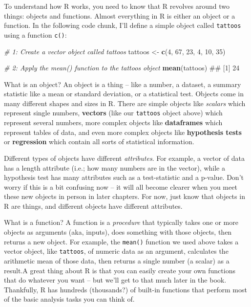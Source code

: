 \documentclass[]{book}
\newenvironment{Shaded}{\begin{snugshade}}{\end{snugshade}}
\newcommand{\KeywordTok}[1]{\textcolor[rgb]{0.13,0.29,0.53}{\textbf{{#1}}}}
\newcommand{\DecValTok}[1]{\textcolor[rgb]{0.00,0.00,0.81}{{#1}}}
\newcommand{\StringTok}[1]{\textcolor[rgb]{0.31,0.60,0.02}{{#1}}}
\newcommand{\CommentTok}[1]{\textcolor[rgb]{0.56,0.35,0.01}{\textit{{#1}}}}
\newcommand{\NormalTok}[1]{{#1}}
\theoremstyle{definition}
\theoremstyle{definition}
\theoremstyle{remark}
\begin{document}
To understand how R works, you need to know that R revolves around two
things: objects and functions. Almost everything in R is either an
object or a function. In the following code chunk, I'll define a simple
object called \texttt{tattoos} using a function \texttt{c()}:

\begin{Shaded}
\begin{Highlighting}[]
\CommentTok{# 1: Create a vector object called tattoos}
\NormalTok{tattoos <-}\StringTok{ }\KeywordTok{c}\NormalTok{(}\DecValTok{4}\NormalTok{, }\DecValTok{67}\NormalTok{, }\DecValTok{23}\NormalTok{, }\DecValTok{4}\NormalTok{, }\DecValTok{10}\NormalTok{, }\DecValTok{35}\NormalTok{)}

\CommentTok{# 2: Apply the mean() function to the tattoos object}
\KeywordTok{mean}\NormalTok{(tattoos)}
\NormalTok{## [1] 24}
\end{Highlighting}
\end{Shaded}

What is an object? An object is a thing -- like a number, a dataset, a
summary statistic like a mean or standard deviation, or a statistical
test. Objects come in many different shapes and sizes in R. There are
simple objects like \textit{scalars} which represent single numbers,
\textbf{vectors} (like our \texttt{tattoos} object above) which
represent several numbers, more complex objects like \textbf{dataframes}
which represent tables of data, and even more complex objects like
\textbf{hypothesis tests} or \textbf{regression} which contain all sorts
of statistical information.

Different types of objects have different \emph{attributes}. For
example, a vector of data has a length attribute (i.e.; how many numbers
are in the vector), while a hypothesis test has many attributes such as
a test-statistic and a p-value. Don't worry if this is a bit confusing
now -- it will all become clearer when you meet these new objects in
person in later chapters. For now, just know that objects in R are
things, and different objects have different attributes.

What is a function? A function is a \emph{procedure} that typically
takes one or more objects as arguments (aka, inputs), does something
with those objects, then returns a new object. For example, the
\texttt{mean()} function we used above takes a vector object, like
\texttt{tattoos}, of numeric data as an argument, calculates the
arithmetic mean of those data, then returns a single number (a scalar)
as a result.A great thing about R is that you can easily create your own
functions that do whatever you want -- but we'll get to that much later
in the book. Thankfully, R has hundreds (thousands?) of built-in
functions that perform most of the basic analysis tasks you can think
of.
\end{document}
